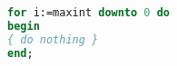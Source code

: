 \begin{lstlisting}[float=b,language=Pascal,frame=tb,caption={A floating example (\texttt{listings} manual)},label=lst:useless]
for i:=maxint downto 0 do
begin
{ do nothing }
end;
\end{lstlisting}


